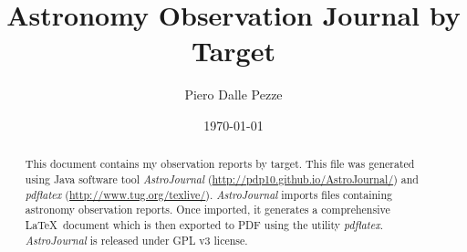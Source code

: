\documentclass[10pt,twoside,a4paper,english]{article}
\title{Astronomy Observation Journal by Target}
\author{Piero Dalle Pezze}
\date{\today}
\begin{document}
\maketitle
\thispagestyle{empty}

\begin{abstract}
This document contains my observation reports by target. This file was generated using Java software tool {\it AstroJournal} (\href{http://pdp10.github.io/AstroJournal/}{http://pdp10.github.io/AstroJournal/}) and {\it pdflatex} (\href{http://www.tug.org/texlive/}{http://www.tug.org/texlive/}). {\it AstroJournal} imports files containing astronomy observation reports. Once imported, it generates a comprehensive \LaTeX\ document which is then exported to PDF using the utility {\it pdflatex}. {\it AstroJournal} is released under GPL v3 license.
\end{abstract}


\tableofcontents

\clearpage
{}


\small

\clearpage


\normalsize
\end{document}
